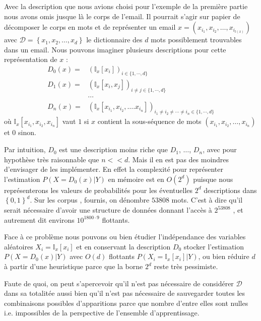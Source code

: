 \documentclass[a4paper, french]{article}
\begin{document}
Avec la description que nous avions choisi pour l'exemple de la
premi\`ere partie nous avons omis jusque l\`a le corps de l'email.
Il pourrait s'agir sur papier de d\'ecomposer le corps en mots et
de repr\'esenter un email $x=\left(x_{i_1},x_{i_2},\ldots,x_{i_{l(x)}}\right)$
avec $\mathcal{D}=\left\{x_1,x_2,\ldots,x_d\right\}$ le dictionnaire des $d$
mots possiblement trouvables dans un email.
Nous pouvons imaginer plusieurs descriptions pour cette
repr\'esentation de $x$ :
\begin{align*}
    \label{eq:description_vect}
    D_0(x) = &\left(\mathbb{I}_x[x_{i}]\right)_{i\in\{1,\cdots,d\}}\\
    D_1(x) = &\left(\mathbb{I}_x[x_{i},x_{j}]\right)_{i\neq j\in\{1,\cdots,d\}}\\
             &\cdots\\
    D_n(x) = &\left(\mathbb{I}_x[x_{i_1},x_{i_2},\ldots.x_{i_n}]\right)%
    _{i_1\neq i_2\neq \cdots \neq i_n\in\{1,\cdots,d\}}
\end{align*}
o\`u $\mathbb{I}_x[x_{i_1},x_{i_2},x_{i_n}]$ vaut $1$ si $x$ contient
la sous-s\'equence de mots $(x_{i_1},x_{i_2},\ldots,x_{i_n})$ et $0$ sinon.

Par intuition, $D_0$ est une description moins riche que $D_1$, $\ldots$,
$D_n$, avec pour hypoth\`ese tr\`es raisonnable que $n<<d$.
Mais il en est pas des moindres d'envisager de les impl\'ementer.
En effet la complexit\'e pour repr\'esenter l'estimation $P(X=D_0(x)|Y)$
en m\'emoire est en $O(2^d)$ puisque nous repr\'esenterons les valeurs de
probabilit\'es pour les \'eventuelles $2^d$ descriptions dans
$\left\{0,1\right\}^d$. Sur les corpus , 
fournis, on d\'enombre $53808$ mots. C'est \`a dire qu'il serait n\'ecessaire
d'avoir une structure de donn\'ees donnant l'acc\`es \`a $2^{53808}$
, et autrement dit environs $10^{1800\cdot9}$ flottants.

Face \`a ce probl\`eme nous pouvons ou bien \'etudier
l'ind\'ependance des variables al\'eatoires $X_i=\mathbb{I}_x[x_i]$
et en conservant la description $D_0$ stocker l'estimation $P(X=D_0(x)|Y)$
avec $O(d)$ flottants $P(X_i=\mathbb{I}_x[x_i]|Y)$, ou bien r\'eduire $d$
\`a partir d'une heuristique parce que la borne $2^d$ reste tr\`es pessimiste.

Faute de quoi, on peut s'apercevoir qu'il n'est pas n\'ecessaire de
consid\'erer $\mathcal{D}$ dans sa totalit\'ee aussi bien qu'il n'est pas
n\'ecessaire de sauvegarder toutes les combinaisons possibles d'apparitions
parce que nombre d'entre elles sont nulles i.e. impossibles de la perspective
de l'ensemble d'apprentissage.
\end{document}
